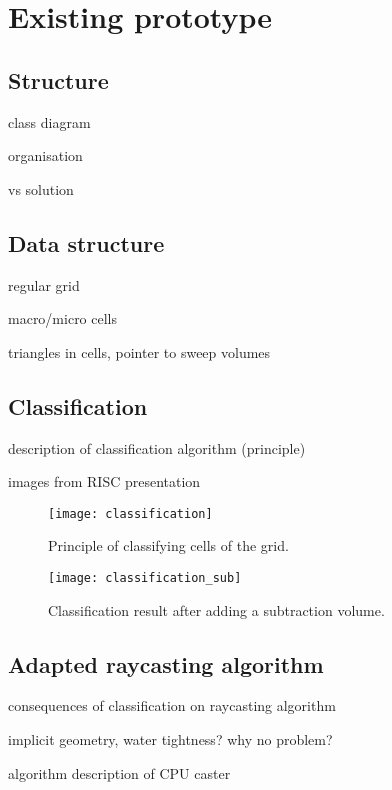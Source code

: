 \section{Existing prototype}


\subsection{Structure}
class diagram

organisation

vs solution


\subsection{Data structure}

regular grid

macro/micro cells

triangles in cells, pointer to sweep volumes


\subsection{Classification}

description of classification algorithm (principle)

images from RISC presentation

\begin{figure}
\centering
\texttt{[image: classification]}
\caption{Principle of classifying cells of the grid.}
\label{fig:classification}
\end{figure}

\begin{figure}
\centering
\texttt{[image: classification\_sub]}
\caption{Classification result after adding a subtraction volume. }
\label{fig:classification_sub}
\end{figure}

\subsection{Adapted raycasting algorithm}

consequences of classification on raycasting algorithm

implicit geometry, water tightness? why no problem?

algorithm description of CPU caster
